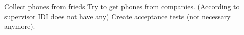 \nextItem Collect phones from frieds
\nextItem Try to get phones from companies. (According to supervisor IDI does not have any)
\nextItem Create acceptance tests (not necessary anymore).
